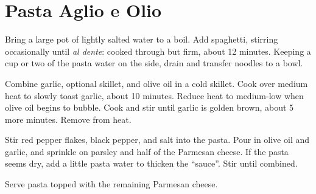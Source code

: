 \section{Pasta Aglio e Olio}
\begin{recipe}
	
	
	
	
	Bring a large pot of lightly salted water to a boil. Add spaghetti, stirring occasionally until \textit{al dente}: cooked through but firm, about 12 minutes. Keeping a cup or two of the pasta water on the side, drain and transfer noodles to a bowl.
	
	Combine garlic, optional skillet, and olive oil in a cold skillet. Cook over medium heat to slowly toast garlic, about 10 minutes. Reduce heat to medium-low when olive oil begins to bubble. Cook and stir until garlic is golden brown, about 5 more minutes. Remove from heat.
	
	Stir red pepper flakes, black pepper, and salt into the pasta. Pour in olive oil and garlic, and sprinkle on parsley and half of the Parmesan cheese. If the pasta seems dry, add a little pasta water to thicken the ``sauce''. Stir until combined.
	
	Serve pasta topped with the remaining Parmesan cheese.
		
\end{recipe}
